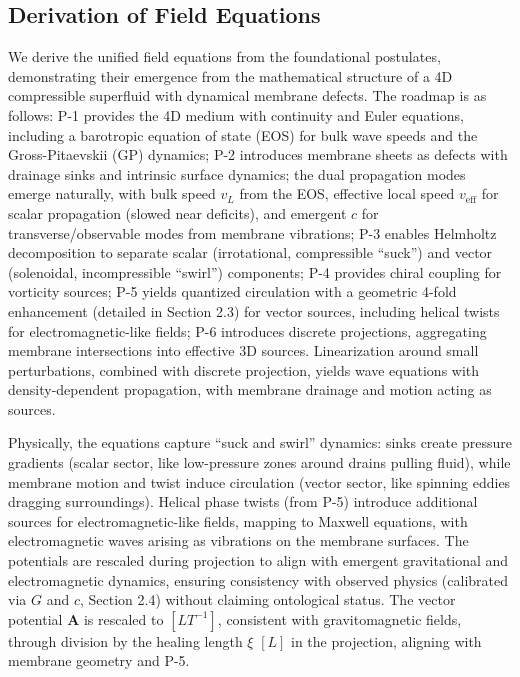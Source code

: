\subsection{Derivation of Field Equations}

We derive the unified field equations from the foundational postulates, demonstrating their emergence from the mathematical structure of a 4D compressible superfluid with dynamical membrane defects. The roadmap is as follows: P-1 provides the 4D medium with continuity and Euler equations, including a barotropic equation of state (EOS) for bulk wave speeds and the Gross-Pitaevskii (GP) dynamics; P-2 introduces membrane sheets as defects with drainage sinks and intrinsic surface dynamics; the dual propagation modes emerge naturally, with bulk speed $v_L$ from the EOS, effective local speed $v_{\text{eff}}$ for scalar propagation (slowed near deficits), and emergent $c$ for transverse/observable modes from membrane vibrations; P-3 enables Helmholtz decomposition to separate scalar (irrotational, compressible ``suck'') and vector (solenoidal, incompressible ``swirl'') components; P-4 provides chiral coupling for vorticity sources; P-5 yields quantized circulation with a geometric 4-fold enhancement (detailed in Section 2.3) for vector sources, including helical twists for electromagnetic-like fields; P-6 introduces discrete projections, aggregating membrane intersections into effective 3D sources. Linearization around small perturbations, combined with discrete projection, yields wave equations with density-dependent propagation, with membrane drainage and motion acting as sources.

Physically, the equations capture ``suck and swirl'' dynamics: sinks create pressure gradients (scalar sector, like low-pressure zones around drains pulling fluid), while membrane motion and twist induce circulation (vector sector, like spinning eddies dragging surroundings). Helical phase twists (from P-5) introduce additional sources for electromagnetic-like fields, mapping to Maxwell equations, with electromagnetic waves arising as vibrations on the membrane surfaces. The potentials are rescaled during projection to align with emergent gravitational and electromagnetic dynamics, ensuring consistency with observed physics (calibrated via $G$ and $c$, Section 2.4) without claiming ontological status. The vector potential $\mathbf{A}$ is rescaled to $[L T^{-1}]$, consistent with gravitomagnetic fields, through division by the healing length $\xi$ $[L]$ in the projection, aligning with membrane geometry and P-5.

